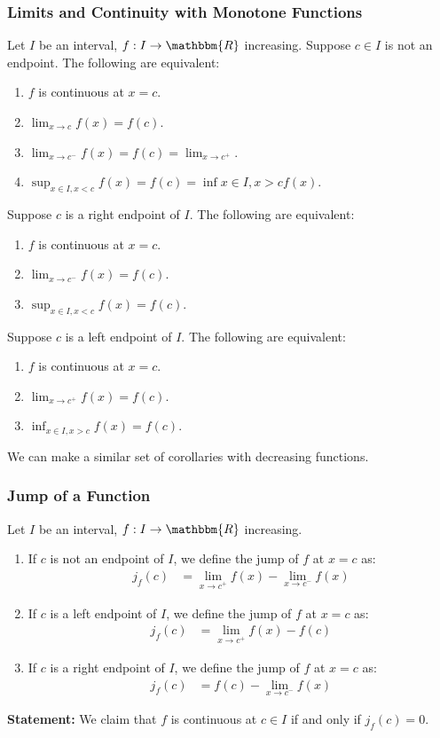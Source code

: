 \documentclass[10pt]{extarticle}
\newcommand{\R}{\mathbbm{R}}
\begin{document}
    \subsubsection{Limits and Continuity with Monotone Functions}%
    Let $I$ be an interval, $f: I\rightarrow \R$ increasing. Suppose $c\in I$ is not an endpoint. The following are equivalent:
    \begin{enumerate}[(1)]
      \item $f$ is continuous at $x=c$.
      \item $\lim_{x\rightarrow c}f(x) = f(c)$.
      \item $\lim_{x\rightarrow c^-}f(x) = f(c) = \lim_{x\rightarrow c^{+}}$.
      \item $\sup_{x\in I,x < c} f(x) = f(c) = \inf{x\in I, x > c}f(x)$.
    \end{enumerate}
    Suppose $c$ is a right endpoint of $I$. The following are equivalent:
    \begin{enumerate}[(1)]
      \item $f$ is continuous at $x=c$.
      \item $\lim_{x\rightarrow c^{-}}f(x) = f(c)$.
      \item $\sup_{x\in I, x < c}f(x) = f(c)$.
    \end{enumerate}
    Suppose $c$ is a left endpoint of $I$. The following are equivalent:
    \begin{enumerate}[(1)]
      \item $f$ is continuous at $x=c$.
      \item $\lim_{x\rightarrow c^{+}}f(x) = f(c)$.
      \item $\inf_{x\in I, x > c}f(x) = f(c)$.
    \end{enumerate}
    We can make a similar set of corollaries with decreasing functions.
    \subsubsection{Jump of a Function}%
    Let $I$ be an interval, $f: I\rightarrow \R$ increasing.
    \begin{enumerate}[(1)]
      \item If $c$ is not an endpoint of $I$, we define the jump of $f$ at $x=c$ as:
        \begin{align*}
          j_f(c) &= \lim_{x\rightarrow c^{+}}f(x) - \lim_{x\rightarrow c^{-}}f(x)
        \end{align*}
      \item If $c$ is a left endpoint of $I$, we define the jump of $f$ at $x=c$ as:
        \begin{align*}
          j_{f}(c) &= \lim_{x\rightarrow c^{+}}f(x) - f(c)
        \end{align*}
      \item If $c$ is a right endpoint of $I$, we define the jump of $f$ at $x=c$ as:
        \begin{align*}
          j_f(c) &= f(c) - \lim_{x\rightarrow c^{-}}f(x)
        \end{align*}
    \end{enumerate}
    \textbf{Statement:} We claim that $f$ is continuous at $c\in I$ if and only if $j_f(c) = 0$.\\
\end{document}
